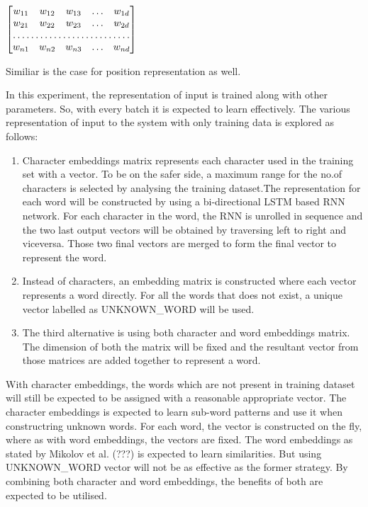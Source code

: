 \documentclass[a4paper, 11pt]{article}
\begin{document}
\begin{center}
$\begin{bmatrix}
    w_{11}       & w_{12} & w_{13} & \dots & w_{1d} \\
    w_{21}       & w_{22} & w_{23} & \dots & w_{2d} \\
    \hdotsfor{5} \\
    w_{n1}       & w_{n2} & w_{n3} & \dots & w_{nd}
\end{bmatrix}
$

\end{center}

Similiar is the case for position representation as well. 

In this experiment, the representation of input is trained along with other parameters. So, with every batch it is expected to learn effectively. The various representation of input to the system with only training data is explored as follows:

\begin{enumerate}
\item Character embeddings matrix represents each character used in the training set with a vector. To be on the safer side, a maximum range for the no.of characters is selected by analysing the training dataset.The representation for each word will be constructed by using a bi-directional LSTM based RNN network. For each character in the word, the RNN is unrolled in sequence and the two last output vectors will be obtained by traversing left to right and viceversa. Those two final vectors are merged to form the final vector to represent the word.
\item Instead of characters, an embedding matrix is constructed where each vector represents a word directly. For all the words that does not exist, a unique vector labelled as UNKNOWN\_WORD will be used. 
\item The third alternative is using both character and word embeddings matrix. The dimension of both the matrix will be fixed and the resultant vector from those matrices  are added together to represent a word. 
\end{enumerate}

With character embeddings, the words which are not present in training dataset will still be expected to be assigned with a reasonable appropriate vector. The character embeddings is expected to learn sub-word patterns and use it when constructring unknown words. For each word, the vector is constructed on the fly, where as with word embeddings, the vectors are fixed. The word embeddings as stated by Mikolov et al. (???) is expected to learn similarities. But using UNKNOWN\_WORD vector will not be as effective as the former strategy. By combining both character and word embeddings, the benefits of both are expected to be utilised. 
\end{document}
